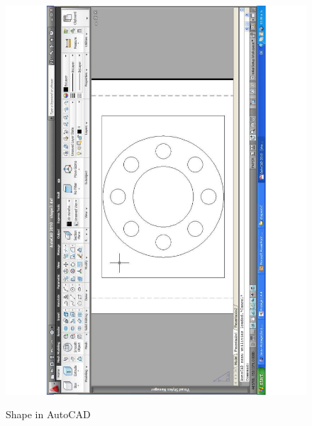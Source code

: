 \begin{figure}
	\centering
	\scriptsize
	\begin{minipage}{.5\textwidth}
		\includegraphics[scale=0.3, angle=-90]{figure-chapterIV/fig4-31}\\
		\caption{Shape in AutoCAD}
		\label{figure4-31}
	\end{minipage}%
	\begin{minipage}{.5\textwidth}

\end{minipage}
\end{figure}
